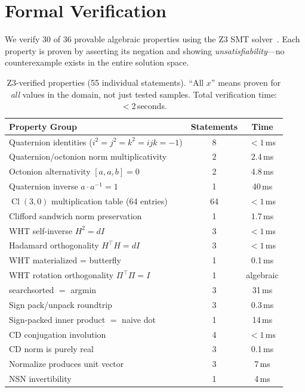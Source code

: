 \documentclass[sigconf,anonymous,review]{acmart}
\DeclareMathOperator{\Cl}{Cl}
\begin{document}
\section{Formal Verification}
\label{sec:verification}

We verify 30 of 36 provable algebraic properties using the Z3 SMT
solver~\cite{z3}. Each property is proven by asserting its negation
and showing \emph{unsatisfiability}---no counterexample exists in the
entire solution space.

\begin{table}[t]
\centering
\caption{Z3-verified properties (55 individual statements).
``All $x$'' means proven for \emph{all} values in the domain,
not just tested samples. Total verification time: ${<}2$\,seconds.}
\label{tab:z3}
\begin{tabular}{lcc}
\toprule
Property Group & Statements & Time \\
\midrule
Quaternion identities ($i^2{=}j^2{=}k^2{=}ijk{=}{-}1$) & 8 & ${<}1$\,ms \\
Quaternion/octonion norm multiplicativity & 2 & 2.4\,ms \\
Octonion alternativity $[a,a,b]{=}0$ & 2 & 4.8\,ms \\
Quaternion inverse $a \cdot a^{-1} = 1$ & 1 & 40\,ms \\
$\Cl(3,0)$ multiplication table (64 entries) & 64 & ${<}1$\,ms \\
Clifford sandwich norm preservation & 1 & 1.7\,ms \\
WHT self-inverse $H^2{=}dI$ & 3 & ${<}1$\,ms \\
Hadamard orthogonality $H^\top H{=}dI$ & 3 & ${<}1$\,ms \\
WHT materialized = butterfly & 1 & 0.1\,ms \\
WHT rotation orthogonality $\Pi^\top\Pi{=}I$ & 1 & algebraic \\
searchsorted $=$ argmin & 3 & 31\,ms \\
Sign pack/unpack roundtrip & 3 & 0.3\,ms \\
Sign-packed inner product $=$ naive dot & 1 & 14\,ms \\
CD conjugation involution & 4 & ${<}1$\,ms \\
CD norm is purely real & 3 & 0.1\,ms \\
Normalize produces unit vector & 3 & 7\,ms \\
NSN invertibility & 1 & 4\,ms \\

\end{tabular}
\end{table}
\end{document}
